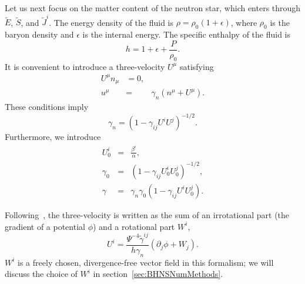 Let us next focus on the matter content of the neutron star, which
enters through $\tilde{E}$, $\tilde{S}$, and $\tilde{J}^i$. The
energy density of the fluid is $\rho=\rho_0\left(1+\epsilon\right)$,
where $\rho_0$ is the baryon density and $\epsilon$ is the internal
energy. The specific enthalpy of the fluid is
\begin{equation}\label{eq:hDefn}
h=1+\epsilon+\frac{P}{\rho_0}.
\end{equation}
It is convenient to introduce a three-velocity $U^\mu$ satisfying
\begin{eqnarray}
  U^\mu n_\mu&=0, \label{eq:QQQQ2}\\
  u^{\mu} &=& \gamma_n\left(n^{\mu}+U^\mu\right).
\end{eqnarray}
These conditions imply
\begin{equation}
\gamma_n = \left(1 - \gamma_{ij}U^iU^j\right)^{-1/2}.
\end{equation}
Furthermore, we introduce
\begin{eqnarray}
  U^i_0 &=& \frac{\beta^i}{\alpha}, \\
\gamma_0 &=& \left(1 - \gamma_{ij}U^i_0U^j_0\right)^{-1/2}, \\
\gamma &=& \gamma_n\gamma_0\left(1-\gamma_{ij}U^iU^j_0\right).
\label{eq:QQQQ3}
\end{eqnarray}

Following~\cite{Tichy:2011gw}, the three-velocity is written as the sum
of an irrotational part (the gradient of a potential $\phi$) and a
rotational part $W^i$,
\begin{equation}
U^i =
\frac{\Psi^{-4}\tilde{\gamma}^{ij}}{h\gamma_n}\left(\partial_j\phi+W_j\right).
\end{equation}
$W^i$ is a freely chosen, divergence-free vector field in this
formalism; we will discuss the choice of $W^i$ in section~\ref{sec:BHNSNumMethods}.

